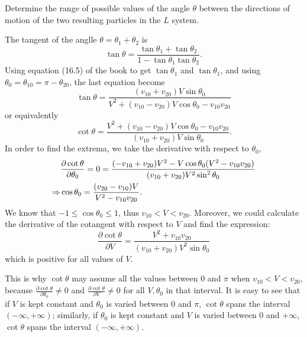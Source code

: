 \begin{problem}
{
Determine the range of possible values of the angle $\theta$ between the directions of motion of the two resulting particles in the $L$ system.
}
{
The tangent of the anglle $\theta = \theta_1 + \theta_2$ is
\begin{equation*}
    \tan{\theta} = \frac{\tan{\theta_1} + \tan{\theta_2}}{1 - \tan{\theta_1}\tan{\theta_2}}.
\end{equation*}
Using equation (16.5) of the book to get $\tan{\theta_1}$ and $\tan{\theta_1}$, and using $\theta_0 = \theta_{10} = \pi - \theta_{20}$, the last equation become
\begin{equation*}
    \tan{\theta} = \frac{(v_{10}+v_{20})V\sin{\theta_0}}{V^2+(v_{10}-v_{20})V\cos{\theta_0} - v_{10}v_{20}}
\end{equation*}
or equivalently
\begin{equation*}
    \cot{\theta} = \frac{V^2+(v_{10}-v_{20})V\cos{\theta_0} - v_{10}v_{20}}{(v_{10}+v_{20})V\sin{\theta_0}}.
\end{equation*}
In order to find the extrema, we take the derivative with respect to $\theta_0$,
\begin{align*}
    &\frac{\partial \cot{\theta}}{\partial \theta_0} = 0 = \frac{(-v_{10}+v_{20})V^2 - V\cos{\theta_0}(V^2-v_{10}v_{20})}{(v_{10}+v_{20})V^2\sin^2{\theta_0}}\\
    \Rightarrow &\cos{\theta_0} = \frac{(v_{20}-v_{10})V}{V^2-v_{10}v_{20}}.
\end{align*}
We know that $-1 \leq \cos{\theta_0} \leq 1$, thus $v_{10} < V < v_{20}$. Moreover, we could calculate the derivative of the cotangent with respect to $ V $ and find the expression:
\begin{equation*}
\frac{\partial \cot{\theta}}{\partial V} = \frac{V^2 + v_{10}v_{20}}{(v_{10}+v_{20})V^2 \sin{\theta_0}}
\end{equation*}
which is positive for all values of $ V $.

This is why $ \cot{\theta} $ may assume all the values between 0 and $ \pi $ when $ v_{10} < V < v_{20} $, because $ \frac{\partial \cot{\theta}}{\partial \theta_0} \neq 0 $ and $ \frac{\partial \cot{\theta}}{\partial V} \neq 0 $ for all $ V, \theta_0 $ in that interval. It is easy to see that if $ V $ is kept constant and $ \theta_0 $ is varied between 0 and $ \pi $, $ \cot{\theta} $ spans the interval $ (-\infty, +\infty) $; similarly, if $ \theta_0 $ is kept constant and $ V $ is varied between 0 and $ +\infty $, $ \cot{\theta} $ spans the interval $ (-\infty, +\infty) $.

}
\end{problem}
